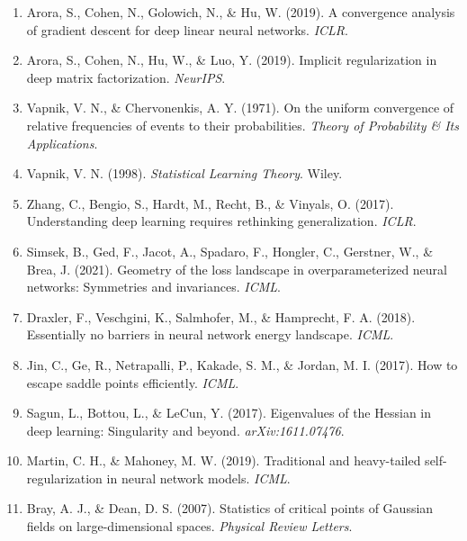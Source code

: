 \documentclass[12pt, a4paper]{ctexart}
\begin{document}
\begin{enumerate}
    \item Arora, S., Cohen, N., Golowich, N., \& Hu, W. (2019). A convergence analysis of gradient descent for deep linear neural networks. \textit{ICLR}.
    
    \item Arora, S., Cohen, N., Hu, W., \& Luo, Y. (2019). Implicit regularization in deep matrix factorization. \textit{NeurIPS}.

    \item Vapnik, V. N., \& Chervonenkis, A. Y. (1971). On the uniform convergence of relative frequencies of events to their probabilities. \textit{Theory of Probability \& Its Applications}.

    \item Vapnik, V. N. (1998). \textit{Statistical Learning Theory}. Wiley.

    \item Zhang, C., Bengio, S., Hardt, M., Recht, B., \& Vinyals, O. (2017). Understanding deep learning requires rethinking generalization. \textit{ICLR}.
    
    \item Simsek, B., Ged, F., Jacot, A., Spadaro, F., Hongler, C., Gerstner, W., \& Brea, J. (2021). Geometry of the loss landscape in overparameterized neural networks: Symmetries and invariances. \textit{ICML}.
    
    \item Draxler, F., Veschgini, K., Salmhofer, M., \& Hamprecht, F. A. (2018). Essentially no barriers in neural network energy landscape. \textit{ICML}.
    
    \item Jin, C., Ge, R., Netrapalli, P., Kakade, S. M., \& Jordan, M. I. (2017). How to escape saddle points efficiently. \textit{ICML}.
    
    \item Sagun, L., Bottou, L., \& LeCun, Y. (2017). Eigenvalues of the Hessian in deep learning: Singularity and beyond. \textit{arXiv:1611.07476}.
    
    \item Martin, C. H., \& Mahoney, M. W. (2019). Traditional and heavy-tailed self-regularization in neural network models. \textit{ICML}.
    
    \item Bray, A. J., \& Dean, D. S. (2007). Statistics of critical points of Gaussian fields on large-dimensional spaces. \textit{Physical Review Letters}.


\end{enumerate}
\end{document}
